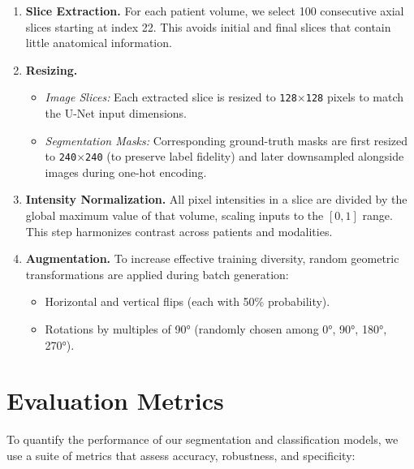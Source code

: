 \begin{enumerate}
  \item \textbf{Slice Extraction.}
        For each patient volume, we select 100 consecutive axial slices starting at index 22. This avoids initial and final slices that contain little anatomical information.

  \item \textbf{Resizing.}
        \begin{itemize}
          \item \emph{Image Slices:} Each extracted slice is resized to \texttt{128$\times$128} pixels to match the U-Net input dimensions.
          \item \emph{Segmentation Masks:} Corresponding ground-truth masks are first resized to \texttt{240$\times$240} (to preserve label fidelity) and later downsampled alongside images during one-hot encoding.
        \end{itemize}

  \item \textbf{Intensity Normalization.}
        All pixel intensities in a slice are divided by the global maximum value of that volume, scaling inputs to the \([0,1]\) range. This step harmonizes contrast across patients and modalities.

  \item \textbf{Augmentation.}
        To increase effective training diversity, random geometric transformations are applied during batch generation:
        \begin{itemize}
          \item Horizontal and vertical flips (each with 50\% probability).
          \item Rotations by multiples of 90° (randomly chosen among 0°, 90°, 180°, 270°).
        \end{itemize}
\end{enumerate}


\section{Evaluation Metrics}
\label{sec:evaluation-metrics}

To quantify the performance of our segmentation and classification models, we use a suite of metrics that assess accuracy, robustness, and specificity:

